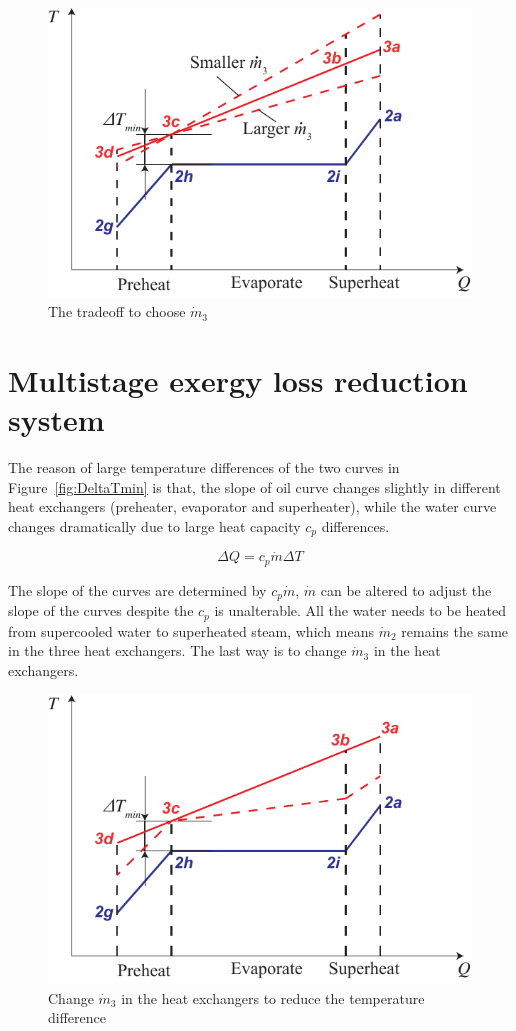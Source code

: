 \noindent \begin{figure}[htbp]
\begin{center}
	\includegraphics[width = 0.5\columnwidth]{fig/DeltaT}
	\caption{The tradeoff to choose $\dot{m}_3$}
	\label{fig:DeltaT}
\end{center}
\end{figure}

\section{Multistage exergy loss reduction system}\label{sec:melrs}
The reason of large temperature differences of the two curves in Figure~\ref{fig:DeltaTmin} is that, the slope of oil curve changes slightly in different heat exchangers (preheater, evaporator and superheater), while the water curve changes dramatically due to large heat capacity $c_p$ differences.

\begin{equation}
  \Delta Q =  c_p\dot{m} \Delta T
\end{equation}

The slope of the curves are determined by $c_p\dot{m}$, $\dot{m}$ can be altered to adjust the slope of the curves despite the $c_p$ is unalterable. All the water needs to be heated from supercooled water to superheated steam, which means $\dot{m}_2$ remains the same in the three heat exchangers. The last way is to change $\dot{m}_3$ in the heat exchangers.

\noindent \begin{figure}[htbp]
\begin{center}
	\includegraphics[width = 0.5\columnwidth]{fig/BetterCurve}
	\caption{Change $\dot{m}_3$ in the heat exchangers to reduce the temperature difference}
	\label{fig:BetterCurve}
\end{center}
\end{figure}


